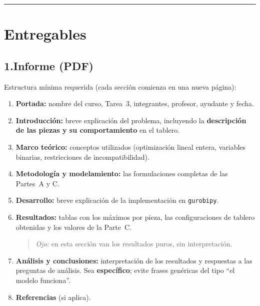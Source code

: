 \documentclass[12pt,a4paper]{article}
\begin{document}
\noindent\rule{\linewidth}{0.4pt}

\section*{Entregables}

\subsection*{1.\quad Informe (PDF)}

Estructura mínima requerida (cada sección comienza en una nueva página):

\begin{enumerate}[leftmargin=*, topsep=2pt]
    \item \textbf{Portada:} nombre del curso, Tarea~3, integrantes, profesor,
          ayudante y fecha.
    \item \textbf{Introducción:} breve explicación del problema, incluyendo la
          \textbf{descripción de las piezas y su comportamiento} en el tablero.
    \item \textbf{Marco teórico:} conceptos utilizados (optimización lineal entera,
          variables binarias, restricciones de incompatibilidad).
    \item \textbf{Metodología y modelamiento:} las formulaciones completas de las
          Partes~A y C.
    \item \textbf{Desarrollo:} breve explicación de la implementación en
          \texttt{gurobipy}.
    \item \textbf{Resultados:} tablas con los máximos por pieza, las
          configuraciones de tablero obtenidas y los valores de la Parte~C.
          \begin{quote}
          \textit{Ojo:} en esta sección van los resultados puros, sin
          interpretación.
          \end{quote}
    \item \textbf{Análisis y conclusiones:} interpretación de los resultados y
          respuestas a las preguntas de análisis. Sea \textbf{específico}; evite
          frases genéricas del tipo ``el modelo funciona''.
    \item \textbf{Referencias} (si aplica).
\end{enumerate}
\end{document}
